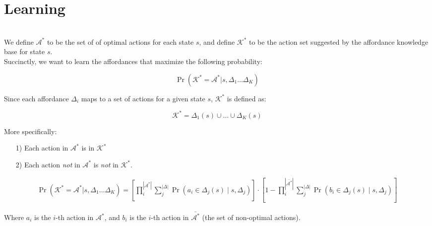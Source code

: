 \documentclass[11pt]{article}
\begin{document}
\section{Learning}

 \\

\noindent We define $\mathcal{A}^*$ to be the set of of optimal actions for each state $s$, and define $\mathcal{K}^*$ to be the action set suggested by the affordance knowledge base for state $s$. \\

\noindent Succinctly, we want to learn the affordances that maximize the following probability:

\begin{equation}
\Pr(\mathcal{K^*} = \mathcal{A}^* | s, \Delta_1 \dots \Delta_K)
\label{eq:master_eq}
\end{equation}

\noindent Since each affordance $\Delta_i$ maps to a set of actions for a given state $s$, $\mathcal{K}^*$ is defined as:

\begin{equation}
\mathcal{K}^* = \Delta_1(s) \cup \ldots \cup \Delta_K(s)
\end{equation}
\vspace{2mm}

\noindent More specifically:
\begin{enumerate}
\item[1)] Each action in $\mathcal{A}^*$ is in $\mathcal{K}^*$
\item[2)] Each action {\it not} in $\mathcal{A}^*$ is {\it not} in $\mathcal{K}^*$.
\end{enumerate}
\begin{align}
\Pr(\mathcal{K^*} = \mathcal{A}^* | s, \Delta_1 \dots \Delta_K)
= \left[\prod_i^{|\mathcal{A}^*|} \sum_j^{|\Delta|} \Pr(a_i \in \Delta_j(s) \mid s, \Delta_j)\right] \cdot
\left[1 - \prod_i^{|\bar{\mathcal{A}^*}|} \sum_j^{|\Delta|} \Pr(b_i \in \Delta_j(s) \mid s, \Delta_j)\right]
\label{eq:isin_notin}
\end{align}

\noindent Where $a_i$ is the $i$-th action in $\mathcal{A}^*$, and $b_i$ is the $i$-th action in $\bar{\mathcal{A}^*}$ (the set of non-optimal actions). \\
\end{document}

